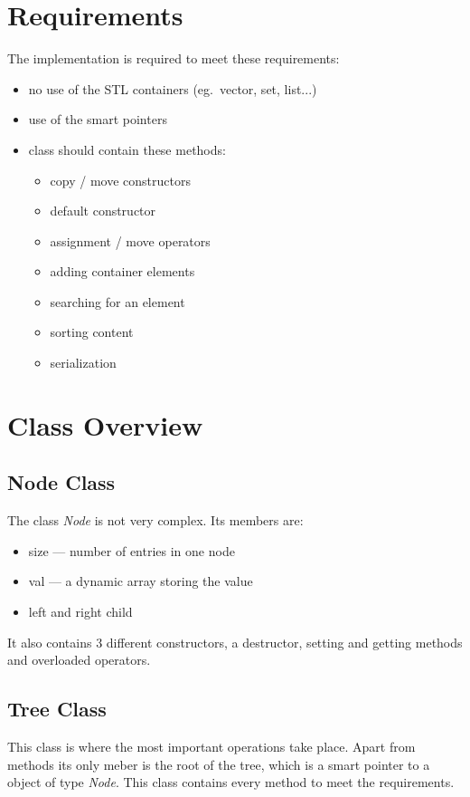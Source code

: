\documentclass[12pt]{article}
\begin{document}
\pagebreak
\section{Requirements}
The implementation is required to meet these requirements:
\begin{itemize}
    \item no use of the STL containers (eg.\ vector, set, list...)
    \item use of the smart pointers
    \item class should contain these methods:
        \begin{itemize}
            \item copy / move constructors
            \item default constructor
            \item assignment / move operators
            \item adding container elements
            \item searching for an element
            \item sorting content
            \item serialization
        \end{itemize}
\end{itemize}

\section{Class Overview}
\subsection{Node Class}
The class \textit{Node} is not very complex. Its members are:
\begin{itemize}
    \item size --- number of entries in one node
    \item val --- a dynamic array storing the value
    \item left and right child
\end{itemize}

It also contains 3 different constructors, a destructor, setting and getting methods and overloaded operators.

\subsection{Tree Class}
This class is where the most important operations take place. Apart from methods its only meber is the root of the tree, which is a smart pointer to a object of type \textit{Node}. This class contains every method to meet the requirements.
\end{document}
